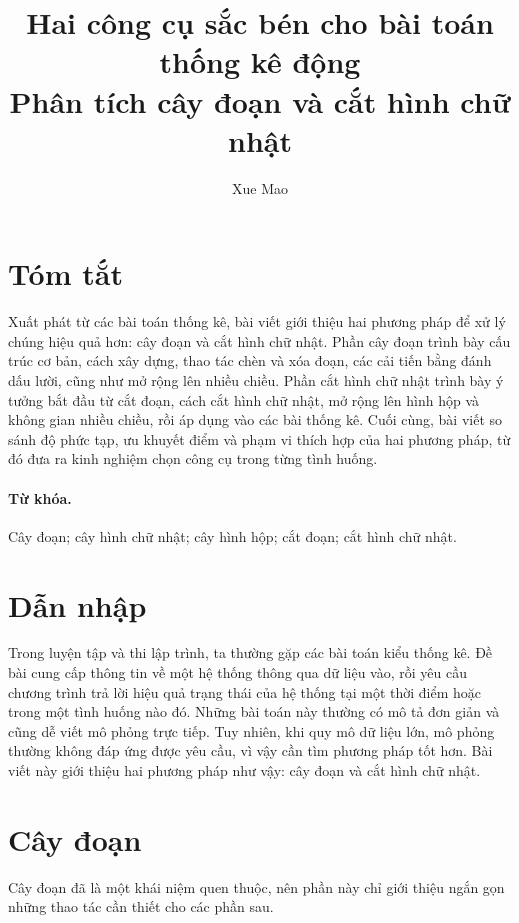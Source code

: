 \documentclass[11pt]{article}
\title{Hai công cụ sắc bén cho bài toán thống kê động\\
\large Phân tích cây đoạn và cắt hình chữ nhật}
\author{Xue Mao}
\date{}
\begin{document}
\maketitle


\section*{Tóm tắt}

Xuất phát từ các bài toán thống kê, bài viết giới thiệu hai phương pháp để xử
lý chúng hiệu quả hơn: cây đoạn và cắt hình chữ nhật. Phần cây đoạn trình bày
cấu trúc cơ bản, cách xây dựng, thao tác chèn và xóa đoạn, các cải tiến bằng
đánh dấu lười, cũng như mở rộng lên nhiều chiều. Phần cắt hình chữ nhật trình
bày ý tưởng bắt đầu từ cắt đoạn, cách cắt hình chữ nhật, mở rộng lên hình hộp
và không gian nhiều chiều, rồi áp dụng vào các bài thống kê. Cuối cùng, bài
viết so sánh độ phức tạp, ưu khuyết điểm và phạm vi thích hợp của hai phương
pháp, từ đó đưa ra kinh nghiệm chọn công cụ trong từng tình huống.

\paragraph{Từ khóa.}
Cây đoạn; cây hình chữ nhật; cây hình hộp; cắt đoạn; cắt hình chữ nhật.

\section{Dẫn nhập}

Trong luyện tập và thi lập trình, ta thường gặp các bài toán kiểu thống kê.
Đề bài cung cấp thông tin về một hệ thống thông qua dữ liệu vào, rồi yêu cầu
chương trình trả lời hiệu quả trạng thái của hệ thống tại một thời điểm hoặc
trong một tình huống nào đó. Những bài toán này thường có mô tả đơn giản và
cũng dễ viết mô phỏng trực tiếp. Tuy nhiên, khi quy mô dữ liệu lớn, mô phỏng
thường không đáp ứng được yêu cầu, vì vậy cần tìm phương pháp tốt hơn. Bài
viết này giới thiệu hai phương pháp như vậy: cây đoạn và cắt hình chữ nhật.

\section{Cây đoạn}

Cây đoạn đã là một khái niệm quen thuộc, nên phần này chỉ giới thiệu ngắn gọn
những thao tác cần thiết cho các phần sau.
\end{document}
